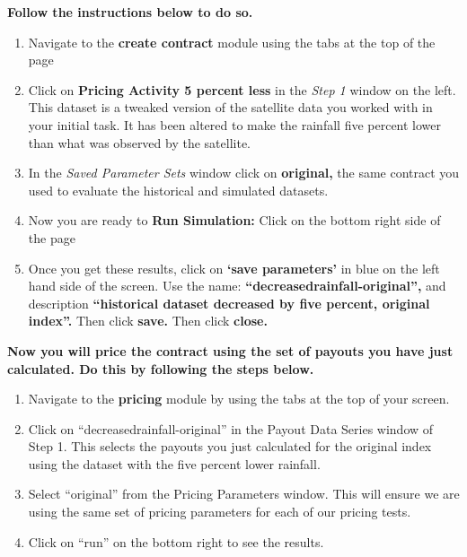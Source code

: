 \documentclass[letterpaper,10pt,english]{sphinxmanual}
\begin{document}
\textbf{Follow the instructions below to do so.}
\begin{enumerate}
\item {} 
Navigate to the \textbf{create contract} module using the tabs at the top of the page

\item {} 
Click on \textbf{Pricing Activity 5 percent less} in the \emph{Step 1} window on the left.  This dataset is a tweaked version of the satellite data you worked with in your initial task. It has been altered to make the rainfall five percent lower than what was observed by the satellite.

\item {} 
In the \emph{Saved Parameter Sets} window click on \textbf{original,} the same contract you used to evaluate the historical and simulated datasets.

\item {} 
Now you are ready to \textbf{Run Simulation:} Click on the bottom right side of the page

\item {} 
Once you get these results, click on \textbf{`save parameters'} in blue on the left hand side of the screen.  Use the name: \textbf{``decreasedrainfall-original'',} and description \textbf{``historical dataset decreased by five percent, original index''.} Then click \textbf{save.} Then click \textbf{close.}

\end{enumerate}

\textbf{Now you will price the contract using the set of payouts you have just calculated.  Do this by following the steps below.}
\begin{enumerate}
\item {} 
Navigate to the \textbf{pricing} module by using the tabs at the top of your screen.

\item {} 
Click on ``decreasedrainfall-original'' in the Payout Data Series window of Step 1.  This selects the payouts you just calculated for the original index using the dataset with the five percent lower rainfall.

\item {} 
Select ``original'' from the Pricing Parameters window. This will ensure we are using the same set of pricing parameters for each of our pricing tests.

\item {} 
Click on ``run'' on the bottom right to see the results.

\end{enumerate}
\end{document}
